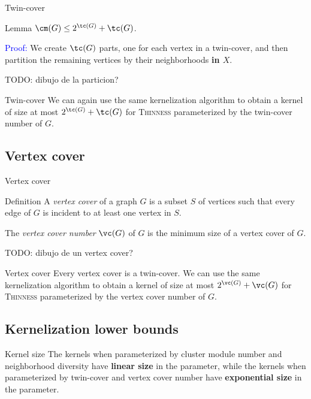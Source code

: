 \documentclass{beamer}
\begin{document}
\begin{frame}{Twin-cover}
    \begin{block}{Lemma}
        $\cm(G) \leq 2^{\tc(G)} + \tc(G)$.
    \end{block}

    \textcolor{blue}{Proof:} We create $\tc(G)$ parts, one for each vertex in a twin-cover, and then partition the remaining vertices by their neighborhoods \textbf{in $X$}.

    TODO: dibujo de la particion?
\end{frame}


\begin{frame}{Twin-cover}
    We can again use the same kernelization algorithm to obtain a kernel of size at most $2^{\tc(G)} + \tc(G)$ for \textsc{Thinness} parameterized by the twin-cover number of $G$.
\end{frame}

\subsection{Vertex cover}
\begin{frame}{Vertex cover}
    \begin{block}{Definition}
        A \emph{vertex cover} of a graph $G$ is a subset $S$ of vertices such that every edge of $G$ is incident to at least one vertex in $S$.

        The \emph{vertex cover number} $\vc(G)$ of $G$ is the minimum size of a vertex cover of $G$.
    \end{block}
    TODO: dibujo de un vertex cover?
\end{frame}

\begin{frame}{Vertex cover}
    Every vertex cover is a twin-cover.
    We can use the same kernelization algorithm to obtain a kernel of size at most $2^{\vc(G)} + \vc(G)$ for \textsc{Thinness} parameterized by the vertex cover number of $G$.
\end{frame}

\subsection{Kernelization lower bounds}
\begin{frame}{Kernel size}
    The kernels when parameterized by cluster module number and neighborhood diversity have \textbf{linear size} in the parameter, while the kernels when parameterized by twin-cover and vertex cover number have \textbf{exponential size} in the parameter.


\end{frame}
\end{document}
